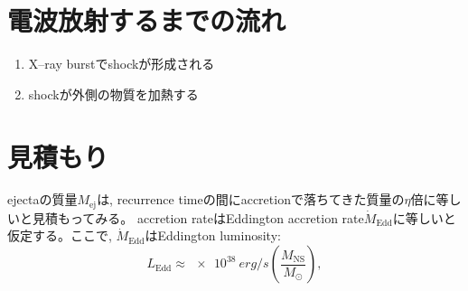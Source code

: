 \documentclass{ltjsarticle}
\begin{document}
\section{電波放射するまでの流れ}
\begin{enumerate}
  \item X--ray burstでshockが形成される
  \item shockが外側の物質を加熱する
\end{enumerate}

\section{見積もり}
ejectaの質量$M_\mathrm{ej}$は, recurrence timeの間にaccretionで落ちてきた質量の$\eta$倍に等しいと見積もってみる。
accretion rateはEddington accretion rate$\dot{M}_{\mathrm{Edd}}$に等しいと仮定する。ここで, $\dot{M}_{\mathrm{Edd}}$はEddington luminosity:
\begin{equation}
  L_\mathrm{Edd} \approx \SI{e38}{erg/s}\left( \frac{M_{\mathrm{NS}}}{M_\odot} \right),
\end{equation}
\end{document}
